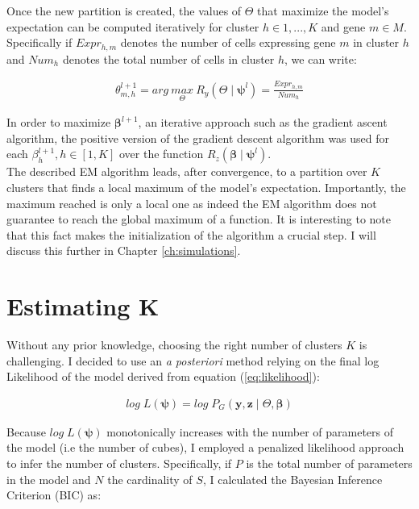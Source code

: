 Once the new partition is created, the values of $\Theta$ that maximize the model's expectation can be computed iteratively for cluster $h \in {1,...,K}$ and gene $m \in M$. Specifically if $Expr_{h,m}$ denotes the number of cells expressing gene $m$ in cluster $h$ and $Num_h$ denotes the total number of cells in cluster $h$, we can write:

\begin{align*}
\theta_{m,h}^{l+1} = arg\:\underset{\Theta}{max}\:R_y(\Theta\mid \boldsymbol{\psi}^l) = \frac{Expr_{h,m}}{Num_h}
\end{align*}

In order to maximize $\boldsymbol{\beta}^{l+1}$, an iterative approach such as the gradient ascent algorithm, the positive version of the gradient descent algorithm \citep{burges2005} was used for each $\beta_h^{l+1}, h \in [1,K]$ over the function $R_z(\boldsymbol{\beta}\mid \boldsymbol{\psi}^l)$. \\



The described EM algorithm leads, after convergence, to a partition over $K$ clusters that finds a local maximum of the model's expectation. Importantly, the maximum reached is only a local one as indeed the EM algorithm does not guarantee to reach the global maximum of a function. It is interesting to note that this fact makes the initialization of the algorithm a crucial step. I will discuss this further in Chapter \ref{ch:simulations}.\\


\section{Estimating K}
Without any prior knowledge, choosing the right number of clusters $K$ is challenging. I decided to use an {\it{a posteriori}} method relying on the final log Likelihood of the model derived from equation (\ref{eq:likelihood}):

\begin{align*}
log\;L(\boldsymbol{\psi}) = 	log\;P_G(\boldsymbol{y},\boldsymbol{z} \mid \Theta, \boldsymbol{\beta})
\end{align*}

Because $log\;L(\boldsymbol{\psi})$ monotonically increases with the number of parameters of the model (i.e the number of cubes), I employed a penalized likelihood approach to infer the number of clusters. Specifically, if $P$ is the total number of parameters in the model and $N$ the cardinality of $S$, I calculated the Bayesian Inference Criterion (BIC) \citep{burnham04} as:

